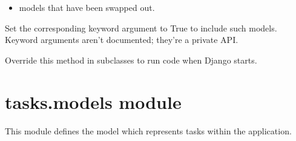 \documentclass[letterpaper,10pt,english]{sphinxmanual}
\begin{document}
\begin{fulllineitems}
\begin{fulllineitems}
\begin{itemize}
\item {} 
\sphinxAtStartPar
models that have been swapped out.

\end{itemize}

\sphinxAtStartPar
Set the corresponding keyword argument to True to include such models.
Keyword arguments aren’t documented; they’re a private API.

\end{fulllineitems}


\begin{fulllineitems}
\label{\detokenize{tasks:tasks.apps.TasksConfig.import_models}}
\pysigstartsignatures
{}
\pysigstopsignatures
\end{fulllineitems}


\begin{fulllineitems}
\label{\detokenize{tasks:tasks.apps.TasksConfig.name}}
\pysigstartsignatures
{}
\pysigstopsignatures
\end{fulllineitems}


\begin{fulllineitems}
\label{\detokenize{tasks:tasks.apps.TasksConfig.ready}}
\pysigstartsignatures
{}
\pysigstopsignatures
\sphinxAtStartPar
Override this method in subclasses to run code when Django starts.

\end{fulllineitems}


\end{fulllineitems}



\section{tasks.models module}
\label{\detokenize{tasks:tasks-models-module}}
\sphinxAtStartPar
This module defines the  model which represents tasks within the application.
\label{\detokenize{tasks:module-tasks.models}}
\end{document}
